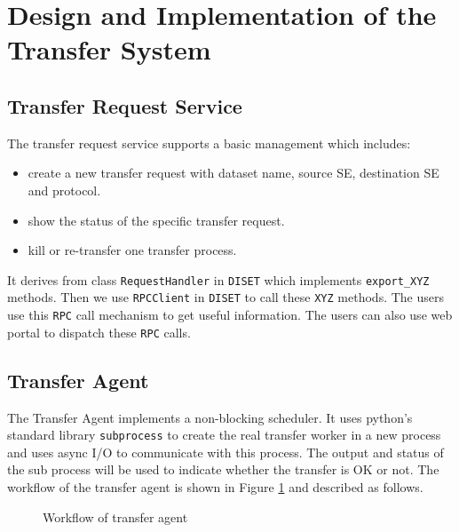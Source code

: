 \section{Design and Implementation of the Transfer System}

\subsection{Transfer Request Service}

The transfer request service supports a basic management which includes:
\begin{itemize}
    \item create a new transfer request with dataset name,
          source SE, destination SE and protocol.
    \item show the status of the specific transfer request.
    \item kill or re-transfer one transfer process.
\end{itemize}
It derives from class {\tt RequestHandler} in {\tt DISET}
which implements \verb"export_XYZ" methods.
Then we use {\tt RPCClient} in {\tt DISET} to call these \verb"XYZ"
methods. The users use this {\tt RPC} call mechanism to get useful
information. The users can also use web portal to dispatch these
{\tt RPC} calls.
%
\subsection{Transfer Agent}
%
The Transfer Agent implements a non-blocking scheduler.
It uses python's standard library {\tt subprocess} to 
create the real transfer worker in a new process
and uses async I/O to communicate with this process.
The output and status of the sub process will be used 
to indicate whether the transfer is OK or not.
%
The workflow of the transfer agent is shown in Figure \ref{fig:agent}
and described as follows.
\begin{figure}[htbp]
    
    \caption{Workflow of transfer agent} \label{fig:agent}
\end{figure}

